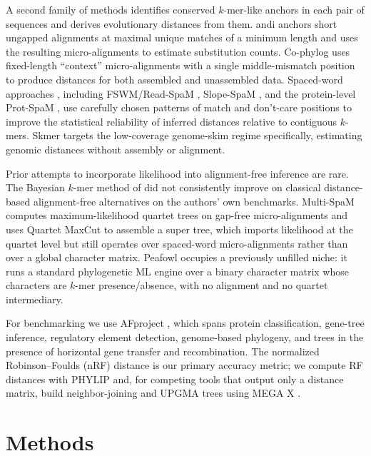 \documentclass[11pt]{article}
\begin{document}
A second family of methods identifies conserved $k$-mer-like anchors in each
pair of sequences and derives evolutionary distances from them. andi
\citep{haubold2015andi} anchors short ungapped alignments at maximal unique
matches of a minimum length and uses the resulting micro-alignments to
estimate substitution counts. Co-phylog \citep{yi2013cophylog} uses
fixed-length ``context'' micro-alignments with a single middle-mismatch
position to produce distances for both assembled and unassembled data.
Spaced-word approaches \citep{morgenstern2015spacedwords}, including
FSWM/Read-SpaM \citep{lau2019readspam}, Slope-SpaM
\citep{rohling2020slopespam}, and the protein-level Prot-SpaM
\citep{leimeister2019protspam}, use carefully chosen patterns of match and
don't-care positions to improve the statistical reliability of inferred
distances relative to contiguous $k$-mers. Skmer \citep{sarmashghi2019skmer}
targets the low-coverage genome-skim regime specifically, estimating
genomic distances without assembly or alignment.

Prior attempts to incorporate likelihood into alignment-free inference are
rare. The Bayesian $k$-mer method of \citet{hohl2007alignmentfree} did not
consistently improve on classical distance-based alignment-free alternatives
on the authors' own benchmarks. Multi-SpaM \citep{dencker2020multispam}
computes maximum-likelihood quartet trees on gap-free micro-alignments and
uses Quartet MaxCut to assemble a super tree, which imports likelihood at
the quartet level but still operates over spaced-word micro-alignments rather
than over a global character matrix. Peafowl occupies a previously unfilled
niche: it runs a standard phylogenetic ML engine over a binary character
matrix whose characters are $k$-mer presence/absence, with no alignment and
no quartet intermediary.

For benchmarking we use AFproject \citep{zielezinski2019afproject}, which
spans protein classification, gene-tree inference, regulatory element
detection, genome-based phylogeny, and trees in the presence of horizontal
gene transfer and recombination. The normalized Robinson--Foulds (nRF)
distance \citep{robinson1981rf} is our primary accuracy metric; we compute
RF distances with PHYLIP \citep{felsenstein1989phylip} and, for competing
tools that output only a distance matrix, build neighbor-joining
\citep{saitou1987nj} and UPGMA \citep{sokal1958upgma} trees using MEGA X
\citep{kumar2018megax}.

\section{Methods}
\end{document}
